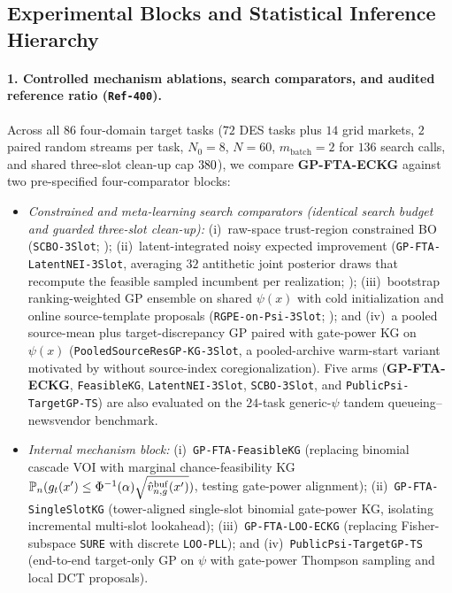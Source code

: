 \begin{enumerate}
\end{enumerate}

\subsection{Experimental Blocks and Statistical Inference Hierarchy}\label{sec:independent_design}

\paragraph{1. Controlled mechanism ablations, search comparators, and audited reference ratio (\texttt{Ref-400}).}
Across all $86$ four-domain target tasks ($72$ DES tasks plus $14$ grid markets, $2$ paired random streams per task, $N_0=8$, $N=60$, $m_{\mathrm{batch}}=2$ for $136$ search calls, and shared three-slot clean-up cap $380$), we compare \textbf{GP-FTA-ECKG} against two pre-specified four-comparator blocks:
\begin{itemize}
  \item \emph{Constrained and meta-learning search comparators (identical search budget and guarded three-slot clean-up):} (i)~raw-space trust-region constrained BO (\texttt{SCBO-3Slot}; \citealp{eriksson2021scalable}); (ii)~latent-integrated noisy expected improvement (\texttt{GP-FTA-LatentNEI-3Slot}, averaging $32$ antithetic joint posterior draws that recompute the feasible sampled incumbent per realization; \citealp{letham2019constrained,ungredda2024bayesian}); (iii)~bootstrap ranking-weighted GP ensemble on shared $\psi(x)$ with cold initialization and online source-template proposals (\texttt{RGPE-on-Psi-3Slot}; \citealp{feurer2018scalable}); and (iv)~a pooled source-mean plus target-discrepancy GP paired with gate-power KG on $\psi(x)$ (\texttt{PooledSourceResGP-KG-3Slot}, a pooled-archive warm-start variant motivated by \citealp{poloczek2017multi} without source-index coregionalization). Five arms (\textbf{GP-FTA-ECKG}, \texttt{FeasibleKG}, \texttt{LatentNEI-3Slot}, \texttt{SCBO-3Slot}, and \texttt{PublicPsi-TargetGP-TS}) are also evaluated on the $24$-task generic-$\psi$ tandem queueing--newsvendor benchmark.
  \item \emph{Internal mechanism block:} (i)~\texttt{GP-FTA-FeasibleKG} (replacing binomial cascade VOI with marginal chance-feasibility KG $\mathbb{P}_n(g_t(x') \le \Phi^{-1}(\alpha)\sqrt{\hat{v}_{n,g}^{\mathrm{buf}}(x')})$, testing gate-power alignment); (ii)~\texttt{GP-FTA-SingleSlotKG} (tower-aligned single-slot binomial gate-power KG, isolating incremental multi-slot lookahead); (iii)~\texttt{GP-FTA-LOO-ECKG} (replacing Fisher-subspace \texttt{SURE} with discrete \texttt{LOO-PLL}); and (iv)~\texttt{PublicPsi-TargetGP-TS} (end-to-end target-only GP on $\psi$ with gate-power Thompson sampling and local DCT proposals).
\end{itemize}
